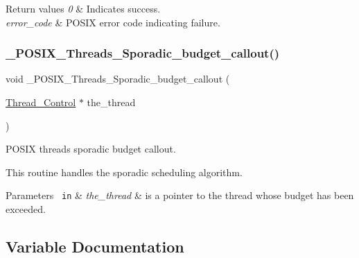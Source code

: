 \begin{DoxyRetVals}{Return values}
{\em 0} & Indicates success. \\
\hline
{\em error\+\_\+code} & P\+O\+S\+IX error code indicating failure. \\
\hline
\end{DoxyRetVals}
\mbox{\label{group__POSIX__PTHREAD_ga9e39e8f504e1f4df1f6cb8f63506453a}} 
\subsubsection{\texorpdfstring{\_POSIX\_Threads\_Sporadic\_budget\_callout()}{\_POSIX\_Threads\_Sporadic\_budget\_callout()}}
{\footnotesize\ttfamily void \+\_\+\+P\+O\+S\+I\+X\+\_\+\+Threads\+\_\+\+Sporadic\+\_\+budget\+\_\+callout (\begin{DoxyParamCaption}\item[{\mbox{\hyperlink{struct__Thread__Control}{Thread\+\_\+\+Control}} $\ast$}]{the\+\_\+thread }\end{DoxyParamCaption})}



P\+O\+S\+IX threads sporadic budget callout. 

This routine handles the sporadic scheduling algorithm.


\begin{DoxyParams}[1]{Parameters}
\mbox{\texttt{ in}}  & {\em the\+\_\+thread} & is a pointer to the thread whose budget has been exceeded. \\
\hline
\end{DoxyParams}


\subsection{Variable Documentation}
\mbox{\label{group__POSIX__PTHREAD_ga69d621e65d4702ab09490f48d8588fd4}} 

